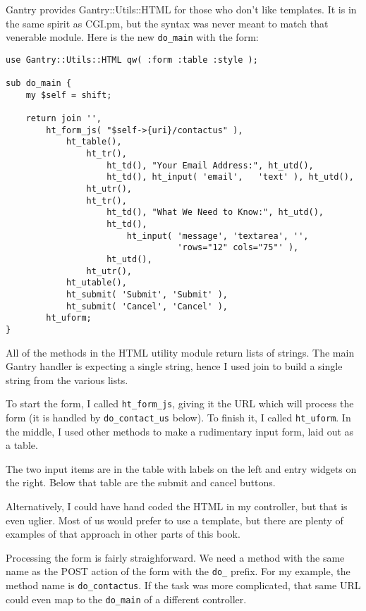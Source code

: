 Gantry provides Gantry::Utils::HTML for those who don't like templates.
It is in the same spirit as CGI.pm, but the syntax was never meant to match
that venerable module.  Here is the new \verb+do_main+ with the form:

\begin{verbatim}
use Gantry::Utils::HTML qw( :form :table :style );

sub do_main {
    my $self = shift;

    return join '',
        ht_form_js( "$self->{uri}/contactus" ),
            ht_table(),
                ht_tr(),
                    ht_td(), "Your Email Address:", ht_utd(),
                    ht_td(), ht_input( 'email',   'text' ), ht_utd(),
                ht_utr(),
                ht_tr(),
                    ht_td(), "What We Need to Know:", ht_utd(),
                    ht_td(),
                        ht_input( 'message', 'textarea', '',
                                  'rows="12" cols="75"' ),
                    ht_utd(),
                ht_utr(),
            ht_utable(),
            ht_submit( 'Submit', 'Submit' ),
            ht_submit( 'Cancel', 'Cancel' ),
        ht_uform;
}
\end{verbatim}

All of the methods in the HTML utility module return lists of strings.  The
main Gantry handler is expecting a single string, hence I used join to
build a single string from the various lists.

To start the form, I called \verb+ht_form_js+, giving it the URL which
will process the form (it is handled by \verb+do_contact_us+ below).
To finish it, I called \verb+ht_uform+.  In the middle, I used other
methods to make a rudimentary input form, laid out as a table.

The two input items are in the table with labels on the left and entry widgets
on the right.  Below that table are the submit and cancel buttons.

Alternatively, I could have hand coded the HTML in my controller, but that
is even uglier.  Most of us would prefer to use a template, but there are
plenty of examples of that approach in other parts of this book.

Processing the form is fairly straighforward.  We need a method with the
same name as the POST action of the form with the \verb+do_+ prefix.  For
my example, the method name is \verb+do_contactus+.  If the task was more
complicated, that same URL could even map to the \verb+do_main+ of a different
controller.

